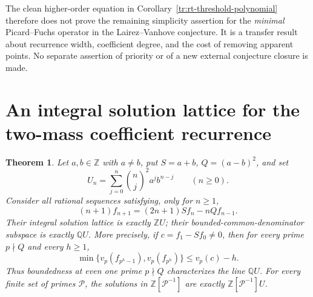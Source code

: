 \documentclass[11pt,a4paper]{article}
\newtheorem{theorem}{Theorem}[section]
\theoremstyle{definition}
\theoremstyle{remark}
\numberwithin{equation}{section}
\begin{document}
The clean higher-order equation in
Corollary~\ref{tr:rt-threshold-polynomial} therefore does not prove
the remaining simplicity assertion for the \emph{minimal}
Picard--Fuchs operator in the Lairez--Vanhove conjecture.  It is a
transfer result about recurrence width, coefficient degree, and
the cost of removing apparent points.  No separate assertion of
priority or of a new external conjecture closure is made.

\section{An integral solution lattice for the two-mass coefficient recurrence}

\begin{theorem}\label{ar:thm:two-mass-lattice}
Let $a,b\in\mathbb Z$ with $a\ne b$, put $S=a+b$, $Q=(a-b)^2$, and set
\[
 U_n=\sum_{j=0}^n\binom nj^2a^jb^{n-j}\qquad(n\ge0).
\]
Consider all rational sequences satisfying, only for $n\ge1$,
\begin{equation}\label{ar:eq:two-mass-recurrence}
 (n+1)f_{n+1}=(2n+1)S f_n-nQ f_{n-1}.
\end{equation}
Their integral solution lattice is exactly $\mathbb ZU$; their
bounded-common-denominator subspace is exactly $\mathbb QU$. More
precisely, if $c=f_1-Sf_0\ne0$, then for every prime $p\nmid Q$ and every
$h\ge1$,
\[
 \min\{v_p(f_{p^h-1}),v_p(f_{p^h})\}\le v_p(c)-h.
\]
Thus boundedness at even one prime $p\nmid Q$ characterizes the line
$\mathbb QU$. For every finite set of primes $\mathcal P$, the solutions
in $\mathbb Z[\mathcal P^{-1}]$ are exactly
$\mathbb Z[\mathcal P^{-1}]U$.
\end{theorem}
\end{document}
